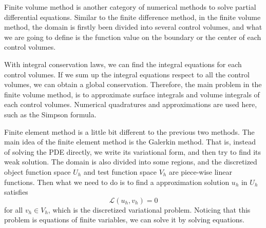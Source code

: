 \documentclass[english, nochinese]{pkupaper}
\begin{document}
Finite volume method is another category of numerical methods to solve partial differential equations. Similar to the finite difference method, in the finite volume method, the domain is firstly been divided into several control volumes, and what we are going to define is the function value on the boundary or the center of each control volumes.

With integral conservation laws, we can find the integral equations for each control volumes. If we sum up the integral equations respect to all the control volumes, we can obtain a global conservation. Therefore, the main problem in the finite volume method, is to approximate surface integrals and volume integrals of each control volumes. Numerical quadratures and approximations are used here, such as the Simpson formula.


Finite element method is a little bit different to the previous two methods. The main idea of the finite element method is the Galerkin method. That is, instead of solving the PDE directly, we write its variational form, and then try to find its weak solution. The domain is also divided into some regions, and the discretized object function space $U_h$ and test function space $V_h$ are piece-wise linear functions. Then what we need to do is to find a approximation solution $u_h$ in $U_h$ satisfies
\begin{equation}
\mathcal{L}(u_h, v_h) = 0
\end{equation}
for all $ v_h \in V_h $, which is the discretized variational problem. Noticing that this problem is equations of finite variables, we can solve it by solving equations.
\end{document}
